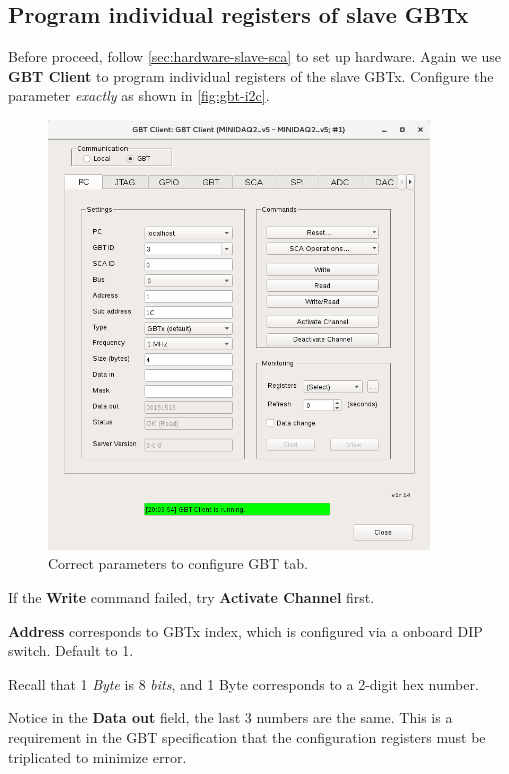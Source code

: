 \subsection{Program individual registers of slave GBTx}
Before proceed, follow \autoref{sec:hardware-slave-sca} to set up hardware.
Again we use \textbf{GBT Client} to program individual registers of the slave
GBTx.
Configure the parameter \emph{exactly} as shown in \autoref{fig:gbt-i2c}.

\begin{figure}[ht]
    \centering
    \includegraphics[width=0.9\textwidth]{res/gbt_client_slave_gbt_i2c_test.png}
    \caption{Correct parameters to configure GBT \itwoc tab.}
    \label{fig:gbt-i2c}
\end{figure}

\begin{leftbar}
    If the \textbf{Write} command failed, try \textbf{Activate Channel} first.
\end{leftbar}

\begin{leftbar}
    \textbf{Address} corresponds to GBTx index, which is configured via a
    onboard DIP switch. Default to 1.
\end{leftbar}

\begin{leftbar}
    Recall that 1 \emph{Byte} is 8 \emph{bits}, and 1 Byte corresponds to a
    2-digit hex number.
\end{leftbar}

\begin{leftbar}
    Notice in the \textbf{Data out} field, the last 3 numbers are the same.
    This is a requirement in the GBT specification that the configuration
    registers must be triplicated to minimize error.
\end{leftbar}
